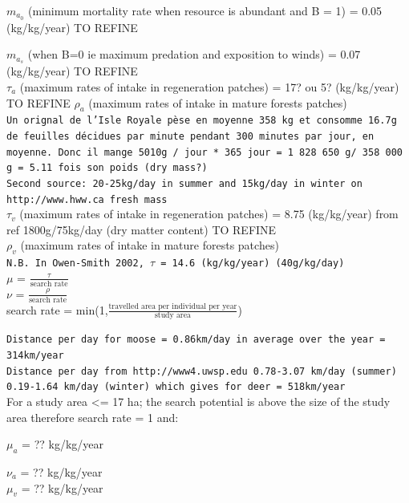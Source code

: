 $m_{a_0}$ (minimum mortality rate when resource is abundant and B = 1) = 0.05 (kg/kg/year) TO REFINE

$m_{a_s}$ (when B=0 ie maximum predation and exposition to winds) = 0.07 (kg/kg/year) TO REFINE \\

$\tau_a$ (maximum rates of intake in regeneration patches) = 17? ou 5? (kg/kg/year) TO REFINE
$\rho_a$ (maximum rates of intake in mature forests patches) \\

\texttt{Un orignal de l’Isle Royale pèse en moyenne 358 kg et consomme 16.7g de feuilles décidues par minute pendant 300 minutes par jour, en moyenne. Donc il mange 5010g / jour * 365 jour = 1 828 650 g/ 358 000 g = 5.11 fois son poids (dry mass?)}\\
\texttt{Second source: 20-25kg/day in summer and 15kg/day in winter on http://www.hww.ca fresh mass} \\

$\tau_v$ (maximum rates of intake in regeneration patches) = 8.75 (kg/kg/year) from ref 1800g/75kg/day (dry matter content) TO REFINE \\
$\rho_v$ (maximum rates of intake in mature forests patches) \\

\texttt{N.B. In Owen-Smith 2002, $\tau$ = 14.6 (kg/kg/year) (40g/kg/day)}\\

$\mu$  = $\frac{\tau}{\text{search rate}}$ \\
$\nu$ = $\frac{\rho}{\text{search rate}}$ \\

search rate = min(1,$\frac{\text{travelled area per individual per year}}{\text{study area}}$)

\texttt{Distance per day for moose = 0.86km/day in average over the year = 314km/year} \\

\texttt{Distance per day from http://www4.uwsp.edu 0.78-3.07 km/day (summer) 0.19-1.64 km/day (winter) which gives for deer = 518km/year} \\

For a study area <= 17 ha; the search potential is above the size of the study area therefore search rate = 1 and:

$\mu_a$ = ?? kg/kg/year 

$\nu_a$ = ?? kg/kg/year \\

$\mu_v$ = ?? kg/kg/year 

